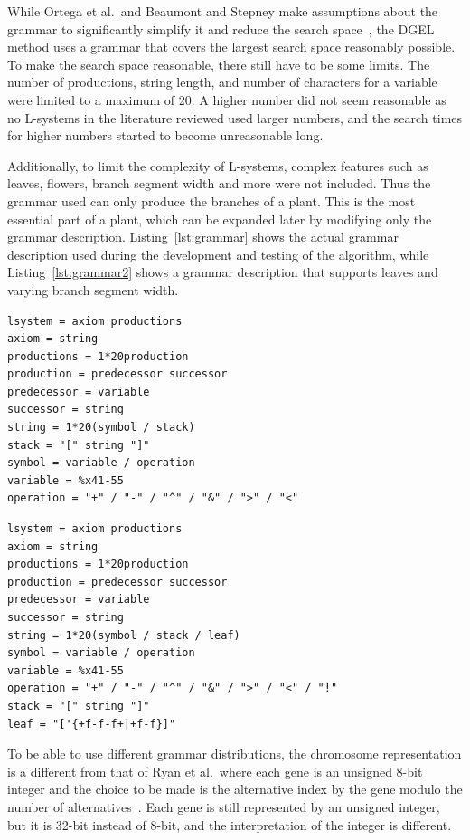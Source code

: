 While Ortega et al.\ and Beaumont and Stepney make assumptions about the grammar to significantly simplify it and reduce the search space~\cite{2003Ortega, 2009Beaumont}, the \gls{DGEL} method uses a grammar that covers the largest search space reasonably possible.
To make the search space reasonable, there still have to be some limits.
The number of productions, string length, and number of characters for a variable were limited to a maximum of 20.
A higher number did not seem reasonable as no \glspl{L-system} in the literature reviewed used larger numbers, and the search times for higher numbers started to become unreasonable long.

Additionally, to limit the complexity of \glspl{L-system}, complex features such as leaves, flowers, branch segment width and more were not included.
Thus the grammar used can only produce the branches of a plant.
This is the most essential part of a plant, which can be expanded later by modifying only the grammar description.
Listing~\ref{lst:grammar} shows the actual grammar description used during the development and testing of the algorithm, while Listing~\ref{lst:grammar2} shows a grammar description that supports leaves and varying branch segment width.

\begin{lstlisting}[caption={[ABNF grammar description used in DGEL]{ABNF grammar description used in \gls{DGEL}}}, label=lst:grammar, float]
lsystem = axiom productions
axiom = string
productions = 1*20production
production = predecessor successor
predecessor = variable
successor = string
string = 1*20(symbol / stack)
stack = "[" string "]"
symbol = variable / operation
variable = %x41-55
operation = "+" / "-" / "^" / "&" / ">" / "<"
\end{lstlisting}

\begin{lstlisting}[caption=ABNF grammar description supporting leaves and varying branch segment width, label=lst:grammar2, float]
lsystem = axiom productions
axiom = string
productions = 1*20production
production = predecessor successor
predecessor = variable
successor = string
string = 1*20(symbol / stack / leaf)
symbol = variable / operation
variable = %x41-55
operation = "+" / "-" / "^" / "&" / ">" / "<" / "!"
stack = "[" string "]"
leaf = "['{+f-f-f+|+f-f}]"
\end{lstlisting}

To be able to use different grammar distributions, the chromosome representation is a different from that of Ryan et al.\ where each gene is an unsigned 8-bit integer and the choice to be made is the alternative index by the gene modulo the number of alternatives~\cite{1998Ryan}.
Each gene is still represented by an unsigned integer, but it is 32-bit instead of 8-bit, and the interpretation of the integer is different.


